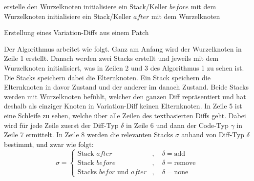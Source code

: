 \begin{algorithm}[H]
	\SetAlgoLined
	\DontPrintSemicolon
	erstelle den Wurzelknoten\;
	initialisiere ein Stack/Keller $before$ mit dem Wurzelknoten\;
	initialisiere ein Stack/Keller $after$ mit dem Wurzelknoten\;
	\;
	\caption{Erstellung eines Variation-Diffs aus einem Patch}
\end{algorithm}
Der Algorithmus arbeitet wie folgt. Ganz am Anfang  wird der Wurzelknoten in Zeile 1 erstellt. Danach werden zwei Stacks erstellt und jeweils mit dem Wurzelknoten initialisiert, was in Zeilen 2 und 3 des Algorithmus 1 zu sehen ist. Die Stacks speichern dabei die Elternknoten. Ein Stack speichern die Elternknoten in davor Zustand und der anderer im danach Zustand. Beide Stacks werden mit Wurzelknoten befühlt, welcher den ganzen Diff repräsentiert und hat deshalb als einziger Knoten in Variation-Diff keinen Elternknoten. In Zeile 5 ist eine Schleife zu sehen, welche über alle Zeilen des textbasierten Diffs geht. Dabei wird für jede Zeile zuerst der Diff-Typ $\delta$ in Zeile 6 und dann der Code-Typ $\gamma$ in Zeile 7 ermittelt. In Zeile 8 werden die relevanten Stacks $\sigma$ anhand von Diff-Typ $\delta$ bestimmt, und zwar wie folgt:
\[ \sigma =
\begin{cases}
	\text{Stack } after      &, \quad \delta = \text{add}\\
	\text{Stack } before  &, \quad \delta = \text{remove}\\
	\text{Stacks } befor \text{ und } after &, \quad \delta = \text{none}
\end{cases}
\]
